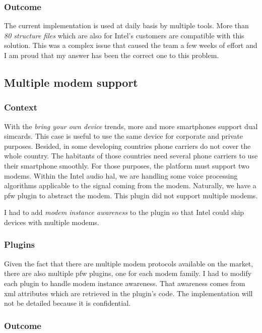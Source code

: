 \subsubsection{Outcome}

The current implementation is used at daily basis by multiple tools.
More than \emph{80 structure files} which are also for Intel's customers are compatible with this solution.
This was a complex issue that caused the team a few weeks of effort and I am proud that my answer has been the
correct one to this problem.


\subsection{Multiple modem support}
\subsubsection{Context}
With the \emph{bring your own device} trends, more and more smartphones support dual simcards. This case
is useful to use the same device for corporate and private purposes.
Besided, in some developing countries phone carriers do not cover the whole country. The habitants of those
countries need several phone carriers to use their smartphone smoothly.
For those purposes, the platform must support two modems.
Within the Intel audio \gls{hal}, we are handling some voice processing algorithms applicable to the signal coming from the modem.
Naturally, we have a \gls{pfw} plugin to abstract the modem. This plugin did not support multiple modems.

I had to add \emph{modem instance awareness} to the plugin so that Intel could ship devices with multiple modems.

\subsubsection{Plugins}
Given the fact that there are multiple modem protocols available on the market, there are also multiple \gls{pfw} plugins,
one for each modem family.
I had to modify each plugin to handle modem instance awareness. That awareness comes from \gls{xml} attributes which are
retrieved in the plugin's code.
The implementation will not be detailed because it is confidential.

\subsubsection{Outcome}

